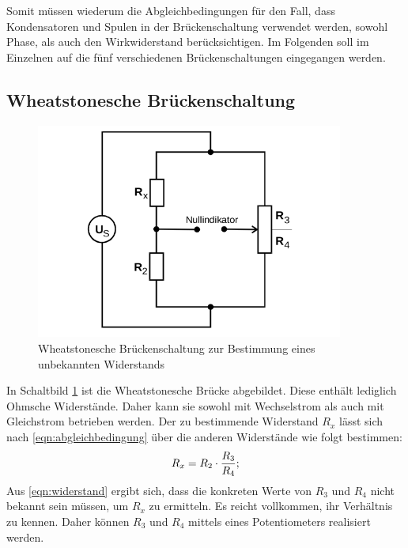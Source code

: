 Somit müssen wiederum die Abgleichbedingungen für den Fall, dass Kondensatoren und Spulen in der Brückenschaltung verwendet werden, sowohl Phase, als auch den Wirkwiderstand berücksichtigen.
Im Folgenden soll im Einzelnen auf die fünf verschiedenen Brückenschaltungen eingegangen werden.

\subsection{Wheatstonesche Brückenschaltung}
\begin{figure}
  \centering
  \includegraphics[width=0.9\textwidth]{Bilder/Wheatstone_bruecke.png}
  \caption{Wheatstonesche Brückenschaltung zur Bestimmung eines unbekannten Widerstands \cite{Anleitung}}
  \label{fig:wheatstonebrücke}
\end{figure}

In Schaltbild \ref{fig:wheatstonebrücke} ist die Wheatstonesche Brücke abgebildet. Diese enthält lediglich Ohmsche Widerstände. Daher kann sie sowohl mit Wechselstrom als auch mit Gleichstrom betrieben werden.
Der zu bestimmende Widerstand $R_x$ lässt sich nach \eqref{eqn:abgleichbedingung} über die anderen Widerstände wie folgt bestimmen:
\begin{equation}
  \centering
  R_x=R_2 \cdot \frac{R_3}{R_4};
\label{eqn:widerstand}
\end{equation}
Aus \eqref{eqn:widerstand} ergibt sich, dass die konkreten Werte von $R_3$ und $R_4$ nicht bekannt sein müssen, um $R_x$ zu ermitteln. Es reicht vollkommen, ihr Verhältnis zu kennen.
Daher können $R_3$ und $R_4$ mittels eines Potentiometers realisiert werden.

